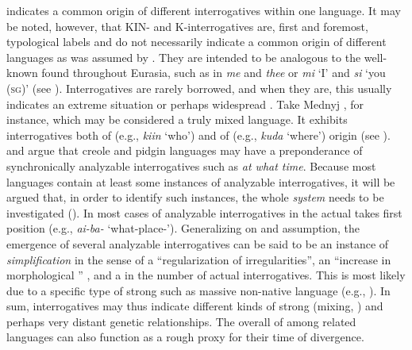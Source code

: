 indicates a common origin of different interrogatives within one language. It may be noted, however, that KIN- and K-interrogatives are, first and foremost, typological labels and do not necessarily indicate a common origin of different languages as was assumed by \cite[217–224]{Greenberg2000}. They are intended to be analogous to the well-known  found throughout Eurasia, such as in  \textit{me} and \textit{thee} or  \textit{mi} ‘I’ and \textit{si} ‘you (\textsc{sg})’ (see \citealt{NicholsPeterson2013}). Interrogatives are rarely borrowed, and when they are, this usually indicates an extreme  situation or perhaps widespread . Take Mednyj , for instance, which may be considered a truly mixed language. It exhibits interrogatives both of  (e.g., \textit{kiin} ‘who’) and of  (e.g., \textit{kuda} ‘where’) origin (see ). \cite[65f.]{Bickerton2016} and \citet{MuyskenSmith1990} argue that creole and pidgin languages may have a preponderance of synchronically analyzable interrogatives such as  \textit{at what time}. Because most languages contain at least some instances of analyzable interrogatives, it will be argued that, in order to identify such instances, the whole \textit{ system} needs to be investigated (\citealt{MuyskenSmith1990}). In most cases of analyzable interrogatives in  the actual  takes first position (e.g.,  \textit{ai-ba-} ‘what-place-’). Generalizing on  and  assumption, the emergence of several analyzable interrogatives can be said to be an instance of \textit{simplification} in the sense of a “regularization of irregularities”, an “increase in morphological ” \citep[62]{Trudgill2011}, and a  in the number of actual interrogatives. This is most likely due to a specific type of strong  such as massive non-native language  (e.g., \citealt{McWhorter2007}). In sum, interrogatives may thus indicate different kinds of strong  (mixing, ) and perhaps very distant genetic relationships. The overall  of  among related languages can also function as a rough proxy for their time of divergence.

